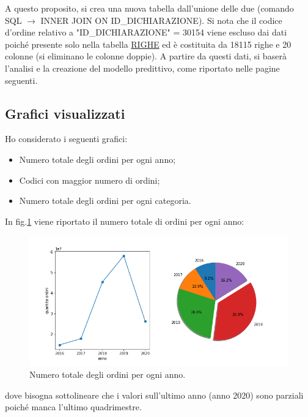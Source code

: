 \documentclass[10pt,a4paper]{report}
\begin{document}
A questo proposito, si crea una nuova tabella dall'unione delle due (comando SQL $\rightarrow$ INNER JOIN ON ID\_DICHIARAZIONE). Si nota che il codice d'ordine relativo a "ID\_DICHIARAZIONE" = 30154 viene escluso dai dati poiché presente solo nella tabella \underline{RIGHE} ed è costituita da 18115 righe e 20 colonne (si eliminano le colonne doppie). A partire da questi dati, si baserà l'analisi e la creazione del modello predittivo, come riportato nelle pagine seguenti.

\subsection*{Grafici visualizzati}
Ho considerato i seguenti grafici:
\begin{itemize}
\item Numero totale degli ordini per ogni anno;
\item Codici con maggior numero di ordini;
\item Numero totale degli ordini per ogni categoria.
\end{itemize}

In fig.\ref{ordi} viene riportato il numero totale di ordini per ogni anno:

\begin{figure}[htpb]
\centering
\includegraphics[scale=.5]{ordini_vs_anno.png}
\caption{Numero totale degli ordini per ogni anno.}
\label{ordi}
\end{figure}
dove bisogna sottolineare che i valori sull'ultimo anno (anno 2020) sono parziali poiché manca l'ultimo quadrimestre. 
\end{document}
